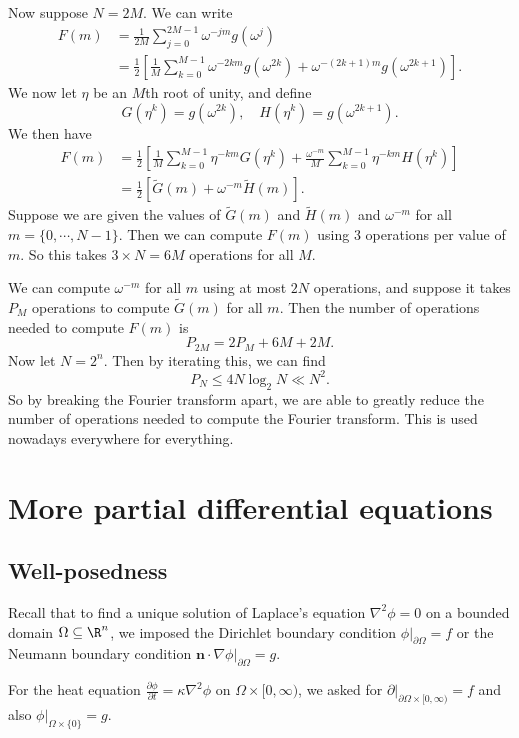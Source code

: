 \documentclass[a4paper]{article}
\begin{document}
Now suppose $N = 2M$. We can write
\begin{align*}
  F(m) &= \frac{1}{2M} \sum_{j = 0}^{2M - 1} \omega^{-jm} g(\omega^j) \\
  &= \frac{1}{2}\left[\frac{1}{M}\sum_{k = 0}^{M - 1} \omega^{-2km} g(\omega^{2k}) + \omega^{-(2k + 1)m} g(\omega^{2k + 1})\right].
\end{align*}
We now let $\eta$ be an $M$th root of unity, and define
\[
  G(\eta^k) = g(\omega^{2k}),\quad H(\eta^k) = g(\omega^{2k + 1}).
\]
We then have
\begin{align*}
  F(m) &= \frac{1}{2} \left[\frac{1}{M} \sum_{k = 0}^{M - 1} \eta^{-km} G(\eta^k) + \frac{\omega^{-m}}{M} \sum_{k = 0}^{M - 1} \eta^{-km} H(\eta^k)\right]\\
  &= \frac{1}{2}[\tilde{G}(m) + \omega^{-m} \tilde{H}(m)].
\end{align*}
Suppose we are given the values of $\tilde{G}(m)$ and $\tilde{H}(m)$ and $\omega^{-m}$ for all $m = \{0, \cdots, N - 1\}$. Then we can compute $F(m)$ using $3$ operations per value of $m$. So this takes $3 \times N = 6M$ operations for all $M$.

We can compute $\omega^{-m}$ for all $m$ using at most $2N$ operations, and suppose it takes $P_M$ operations to compute $\tilde{G}(m)$ for all $m$. Then the number of operations needed to compute $F(m)$ is
\[
  P_{2M} = 2 P_M + 6M + 2M.
\]
Now let $N = 2^n$. Then by iterating this, we can find
\[
  P_N \leq 4N \log_2 N \ll N^2.
\]
So by breaking the Fourier transform apart, we are able to greatly reduce the number of operations needed to compute the Fourier transform. This is used nowadays everywhere for everything.
\section{More partial differential equations}
\subsection{Well-posedness}
Recall that to find a unique solution of Laplace's equation $\nabla^2 \phi = 0$ on a bounded domain $\Omega \subseteq \R^n$, we imposed the Dirichlet boundary condition $\phi|_{\partial \Omega} = f$ or the Neumann boundary condition $\mathbf{n}\cdot \nabla \phi|_{\partial \Omega} = g$.

For the heat equation $\frac{\partial \phi}{\partial t} = \kappa \nabla^2 \phi$ on $\Omega \times [0, \infty)$, we asked for $\partial |_{\partial \Omega \times [0, \infty)} = f$ and also $\phi|_{\Omega \times \{0\}} = g$.
\end{document}
